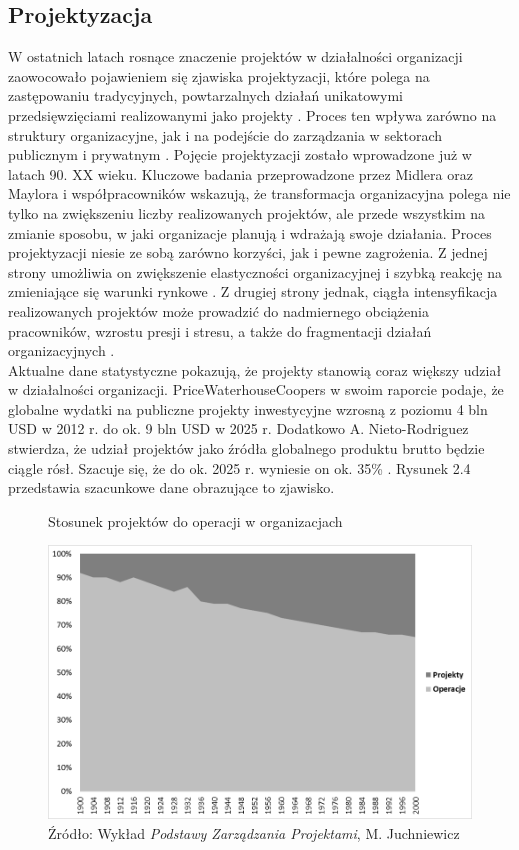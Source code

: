 \subsection{Projektyzacja}
W ostatnich latach rosnące znaczenie projektów w działalności organizacji zaowocowało pojawieniem się zjawiska projektyzacji, które polega na zastępowaniu tradycyjnych, powtarzalnych działań unikatowymi przedsięwzięciami realizowanymi jako projekty \autocite{Juchniewicz2018}. Proces ten wpływa zarówno na struktury organizacyjne, jak i na podejście do zarządzania w sektorach publicznym i prywatnym \autocite{Midler1995}.
Pojęcie projektyzacji zostało wprowadzone już w latach 90. XX wieku. Kluczowe badania przeprowadzone przez Midlera oraz Maylora i współpracowników \autocite{Maylor2006} wskazują, że transformacja organizacyjna polega nie tylko na zwiększeniu liczby realizowanych projektów, ale przede wszystkim na zmianie sposobu, w jaki organizacje planują i wdrażają swoje działania. Proces projektyzacji niesie ze sobą zarówno korzyści, jak i pewne zagrożenia. Z jednej strony umożliwia on zwiększenie elastyczności organizacyjnej i szybką reakcję na zmieniające się warunki rynkowe \autocite{Prawelska2011}. Z drugiej strony jednak, ciągła intensyfikacja realizowanych projektów może prowadzić do nadmiernego obciążenia pracowników, wzrostu presji i stresu, a także do fragmentacji działań organizacyjnych \autocite{Jalocha2012}.
\\
Aktualne dane statystyczne pokazują, że projekty stanowią coraz większy udział w działalności organizacji. PriceWaterhouseCoopers w swoim raporcie podaje, że globalne wydatki na publiczne projekty inwestycyjne wzrosną z poziomu 4 bln USD w 2012 r. do ok. 9 bln USD w 2025 r. \autocite{pwc}
Dodatkowo A. Nieto-Rodriguez stwierdza, że udział projektów jako źródła globalnego produktu brutto będzie ciągle rósł. Szacuje się,
że do ok. 2025 r. wyniesie on ok. 35\% \autocite{Nieto}. Rysunek 2.4 przedstawia szacunkowe dane obrazujące to zjawisko.
\begin{figure}
\centering
\caption{Stosunek projektów do operacji w organizacjach}
\includegraphics[width=14cm]{img/projektyzacja.png}
\caption*{Źródło: Wykład \textit{Podstawy Zarządzania Projektami}, M. Juchniewicz}
\end{figure}
